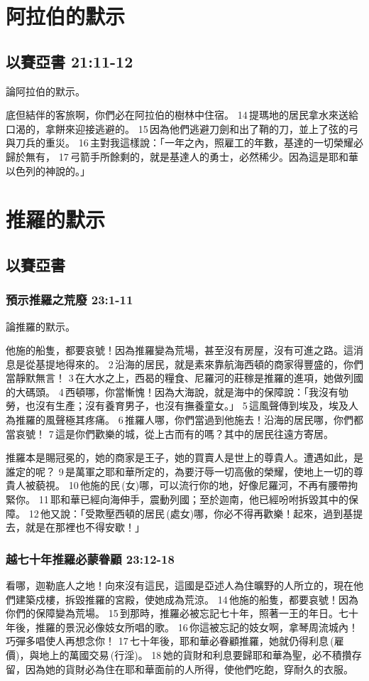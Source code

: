 \section{阿拉伯的默示}
\subsection{以賽亞書  21:11-12}
論阿拉伯的默示。

底但結伴的客旅啊，你們必在阿拉伯的樹林中住宿。 14 提瑪地的居民拿水來送給口渴的，拿餅來迎接逃避的。 15 因為他們逃避刀劍和出了鞘的刀，並上了弦的弓與刀兵的重災。 16 主對我這樣說：「一年之內，照雇工的年數，基達的一切榮耀必歸於無有， 17 弓箭手所餘剩的，就是基達人的勇士，必然稀少。因為這是耶和華以色列的神說的。」



\section{推羅的默示}
\subsection{以賽亞書}
\subsubsection{預示推羅之荒廢 23:1-11}
論推羅的默示。

他施的船隻，都要哀號！因為推羅變為荒場，甚至沒有房屋，沒有可進之路。這消息是從基提地得來的。 2 沿海的居民，就是素來靠航海西頓的商家得豐盛的，你們當靜默無言！ 3 在大水之上，西曷的糧食、尼羅河的莊稼是推羅的進項，她做列國的大碼頭。 4 西頓哪，你當慚愧！因為大海說，就是海中的保障說：「我沒有劬勞，也沒有生產；沒有養育男子，也沒有撫養童女。」 5 這風聲傳到埃及，埃及人為推羅的風聲極其疼痛。 6 推羅人哪，你們當過到他施去！沿海的居民哪，你們都當哀號！ 7 這是你們歡樂的城，從上古而有的嗎？其中的居民往遠方寄居。

推羅本是賜冠冕的，她的商家是王子，她的買賣人是世上的尊貴人。遭遇如此，是誰定的呢？ 9 是萬軍之耶和華所定的，為要汙辱一切高傲的榮耀，使地上一切的尊貴人被藐視。 10 他施的民 (女)哪，可以流行你的地，好像尼羅河，不再有腰帶拘緊你。 11 耶和華已經向海伸手，震動列國；至於迦南，他已經吩咐拆毀其中的保障。 12 他又說：「受欺壓西頓的居民 (處女)哪，你必不得再歡樂！起來，過到基提去，就是在那裡也不得安歇！」

\subsubsection{越七十年推羅必蒙眷顧 23:12-18}
看哪，迦勒底人之地！向來沒有這民，這國是亞述人為住曠野的人所立的，現在他們建築戍樓，拆毀推羅的宮殿，使她成為荒涼。 14 他施的船隻，都要哀號！因為你們的保障變為荒場。 15 到那時，推羅必被忘記七十年，照著一王的年日。七十年後，推羅的景況必像妓女所唱的歌。 16 你這被忘記的妓女啊，拿琴周流城內！巧彈多唱使人再想念你！ 17 七十年後，耶和華必眷顧推羅，她就仍得利息 (雇價)，與地上的萬國交易 (行淫)。 18 她的貨財和利息要歸耶和華為聖，必不積攢存留，因為她的貨財必為住在耶和華面前的人所得，使他們吃飽，穿耐久的衣服。

